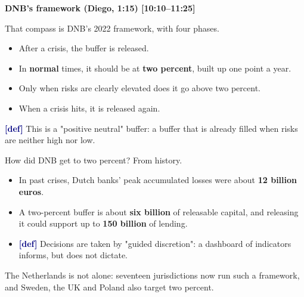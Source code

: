 {\small\textbf{DNB's framework (Diego, 1:15) [10:10–11:25]}}\par\smallskip
That compass is DNB's 2022 framework, with four phases.
\begin{itemize}\setlength\itemsep{0pt}
\item After a crisis, the buffer is released.
\item In \textbf{normal} times, it should be at \textbf{two percent}, built up one point a year.
\item Only when risks are clearly elevated does it go above two percent.
\item When a crisis hits, it is released again.
\end{itemize}
\par\smallskip
\textcolor{navy}{\textbf{[def]}} This is a "positive neutral" buffer: a buffer that is already filled when risks are neither high nor low.
\par\smallskip
How did DNB get to two percent? From history.
\begin{itemize}\setlength\itemsep{0pt}
\item In past crises, Dutch banks' peak accumulated losses were about \textbf{12 billion euros}.
\item A two-percent buffer is about \textbf{six billion} of releasable capital, and releasing it could support up to \textbf{150 billion} of lending.
\item \textcolor{navy}{\textbf{[def]}} Decisions are taken by "guided discretion": a dashboard of indicators informs, but does not dictate.
\end{itemize}
\par\smallskip
The Netherlands is not alone: seventeen jurisdictions now run such a framework, and Sweden, the UK and Poland also target two percent.
